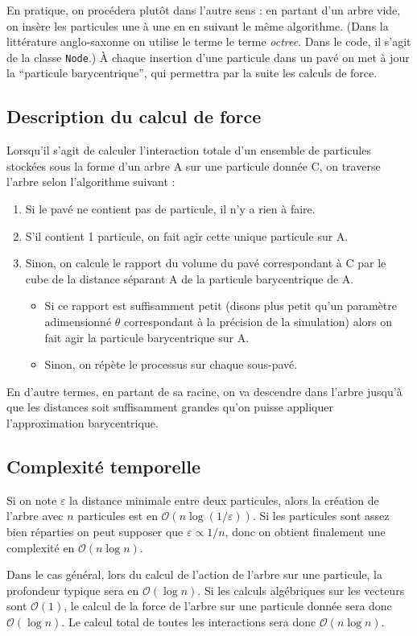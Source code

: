 \documentclass[12pt, letterpaper, twoside]{article}
\newcommand{\T}[1]{\texttt{#1}}
\def\O{\mathcal{O}}
\def\epsilon{\varepsilon}
\begin{document}
En pratique, on procédera plutôt dans l'autre sens : en partant d'un arbre vide, on insère les particules une à une en en suivant le même algorithme. (Dans la littérature anglo-saxonne on utilise le terme le terme \textit{octree}. Dans le code, il s'agit de la classe \T{Node}.) À chaque insertion d'une particule dans un pavé on met à jour la ``particule barycentrique'', qui permettra par la suite les calculs de force.

\subsection*{Description du calcul de force}
Lorsqu'il s'agit de calculer l'interaction totale d'un ensemble de particules stockées sous la forme d'un arbre A sur une particule donnée C, on traverse l'arbre selon l'algorithme suivant :

\begin{enumerate}
	\item Si le pavé ne contient pas de particule, il n'y a rien à faire.
	\item S'il contient 1 particule, on fait agir cette unique particule sur A.
	\item Sinon, on calcule le rapport du volume du pavé correspondant à C par le cube de la distance séparant A de la particule barycentrique de A.
\begin{itemize}
	\item Si ce rapport est suffisamment petit (disons plus petit qu'un paramètre adimensionné $\theta$ correspondant à la précision de la simulation) alors on fait agir la particule barycentrique sur A.
	\item Sinon, on répète le processus sur chaque sous-pavé.
\end{itemize}
\end{enumerate}
En d'autre termes, en partant de sa racine, on va descendre dans l'arbre jusqu'à que les distances soit suffisamment grandes qu'on puisse appliquer l'approximation barycentrique.
\subsection*{Complexité temporelle}
Si on note $\epsilon$ la distance minimale entre deux particules, alors la création de l'arbre avec $n$ particules est en $\O(n \log(1/\epsilon))$. Si les particules sont assez bien réparties on peut supposer que $\epsilon \propto 1/n$, donc on obtient finalement une complexité en $\O(n \log n)$.

Dans le cas général, lors du calcul de l'action de l'arbre sur une particule, la profondeur typique sera en $\O(\log n)$. Si les calculs algébriques sur les vecteurs sont $\O(1)$, le calcul de la force de l'arbre sur une particule donnée sera donc $\O(\log n)$. Le calcul total de toutes les interactions sera donc $\O(n \log n)$.
\end{document}
